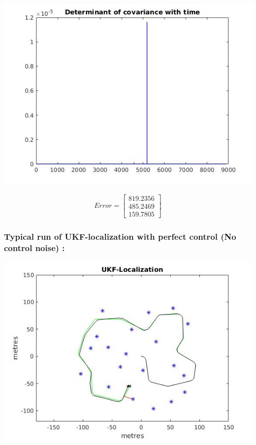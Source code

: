 \documentclass[a4paper,fleqn,11pt]{article}
\theoremstyle{mytheor}
\begin{document}
\begin{center}
\includegraphics[scale = 0.37]{../images/UKF-default1-cvt.jpg}
\end{center}

\begin{align*}
Error = \begin{bmatrix}
			 819.2356\\
			 485.2469\\
			 159.7805
		\end{bmatrix}
\end{align*}

\subsubsection{Typical run of UKF-localization with perfect control (No control noise) :}

\begin{center}
\includegraphics[scale = 0.74]{../images/UKF-perfect-control.jpg} \\
\end{center}
\end{document}
